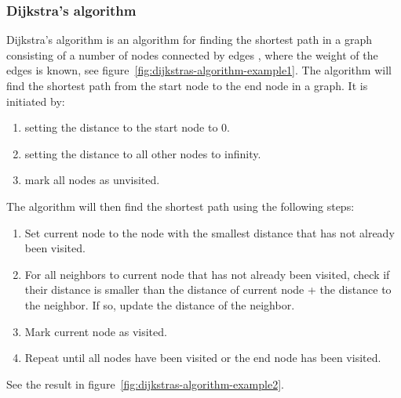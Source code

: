 \documentclass {article}
\begin{document}
\subsubsection{Dijkstra's algorithm}
Dijkstra's algorithm is an algorithm for finding the shortest path in a graph consisting of a number of nodes connected by edges \cite{weiss}, where the weight of the edges is known, see figure~\ref{fig:dijkstras-algorithm-example1}. The algorithm will find the shortest path from the start node to the end node in a graph. It is initiated by:
\begin{enumerate}
\item setting the distance to the start node to 0.
\item setting the distance to all other nodes to infinity.
\item mark all nodes as unvisited.
\end{enumerate}
The algorithm will then find the shortest path using the following steps:
\begin{enumerate}
\item Set current node to the node with the smallest distance that has not already been visited.
\item For all neighbors to current node that has not already been visited, check if their distance is smaller than the distance of current node + the distance to the neighbor. If so, update the distance of the neighbor.
\item Mark current node as visited.
\item Repeat until all nodes have been visited or the end node has been visited.
\end{enumerate}
See the result in figure~\ref{fig:dijkstras-algorithm-example2}.
 
\end{document}
